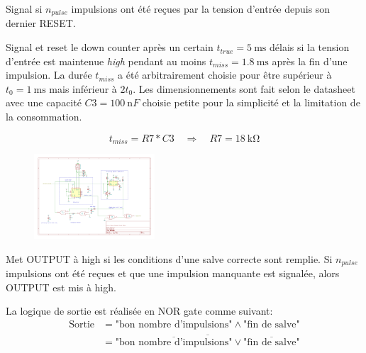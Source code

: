 \documentclass[french]{layout/Report}
\begin{document}
\begin{description}[leftmargin=!,labelwidth=4cm, labelindent=\parindent]
	\item[Down counter]
        Signal si $n_{pulse}$ impulsions ont été reçues par la tension d'entrée depuis son dernier RESET.
	\item[Missing pulse detector]
        Signal et reset le down counter après un certain $t_{true} = \SI{5}{\milli\second}$ délais si la tension d'entrée est maintenue \emph{high} pendant au moins $t_{miss} = \SI{1.8}{\milli\second}$ après la fin d'une impulsion.
        La durée $t_{miss}$ a été arbitrairement choisie pour être supérieur à $t_0 = \SI{1}{\milli\second}$ mais inférieur à $2t_0$.
        Les dimensionnements sont fait selon le datasheet \cite{TLC555} avec une capacité $\mathit{C3} = \SI{100}{\nano F}$ choisie petite pour la simplicité et la limitation de la consommation.

		\begin{equation*}
			t_{miss} = \mathit{R7}*\mathit{C3} \quad\Rightarrow\quad \mathit{R7} = \SI{18}{\kilo\ohm}
		\end{equation*}

		\begin{figure}[H]
			\centering
			\includegraphics[width=0.4\textwidth]{fig/missing_pulse_detector.pdf}
		\end{figure}


	\item[Logic]
        Met OUTPUT à high si les conditions d'une salve correcte sont remplie.
        Si $n_{pulse}$ impulsions ont été reçues et que une impulsion manquante est signalée, alors OUTPUT est mis à high. 

        La logique de sortie est réalisée en NOR gate comme suivant:
        \begin{align*}
        \text{Sortie} & = \text{"bon nombre d'impulsions"} \land \text{"fin de salve"} \\
        & = \overline{\overline{\text{"bon nombre d'impulsions"}} \lor \overline{\text{"fin de salve"}}}
        \end{align*}


\end{description}
\end{document}

